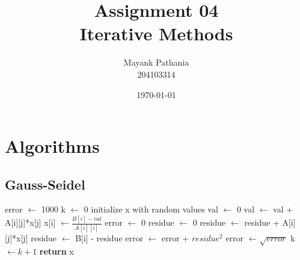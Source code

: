 \documentclass[12pt]{article}
\title{Assignment 04\\
Iterative Methods
}
\author{Mayank Pathania\\204103314}
\date{\today}
\begin{document}
\maketitle

\section{Algorithms}
\subsection{Gauss-Seidel}
\begin{center}
    \begin{algorithmic}[1]
        \Statex {}
        \Statex {}
        \Statex {}
        \Statex {}
        \State error $\gets$ 1000 
        \State k $\gets$ 0 
        \State initialize x with random values
                \State val $\gets$ 0
                        \State val $\gets$ val + A[i][j]*x[j]
                    \EndIf
                \EndFor
                \State x[i] $\gets \frac{B[i] - val}{A[i][i]}$
            \EndFor
            \State error $\gets$ 0
                \State residue $\gets$ 0
                    \State residue $\gets$ residue + A[i][j]*x[j]
                \EndFor
                \State residue $\gets$ B[i] - residue
                \State error $\gets$ error + $residue^2$
            \EndFor
            \State error $\gets \sqrt{error}$
            \State k $\gets k + 1 $
        \EndWhile
        \State \textbf{return} x
        \EndProcedure
    \end{algorithmic}
\end{center}
\end{document}
